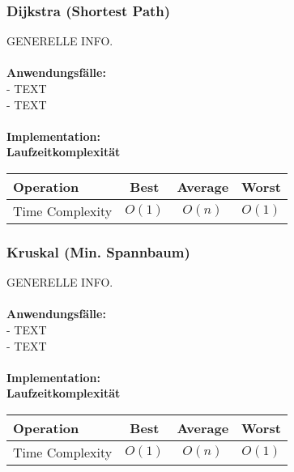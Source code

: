 \documentclass[../main.tex]{subfiles}
\begin{document}
	\subsubsection{Dijkstra (Shortest Path)}
	GENERELLE INFO. \\\\
	\textbf{Anwendungsfälle:}\\
	- TEXT\\
	- TEXT\\\\
	\textbf{Implementation:}\\
	 
	\textbf{Laufzeitkomplexität}\\
	\begin{table}[ht]
		\centering
		\begin{tabular}{l *{3}{c}}
			\toprule
			Operation & Best & Average & Worst\\
			\midrule
			Time Complexity & $O(1)$ & $O(n)$ & $O(1)$\\
			\bottomrule
		\end{tabular}
	\end{table}
	\clearpage
	
	\subsubsection{Kruskal (Min. Spannbaum)}
	GENERELLE INFO. \\\\
	\textbf{Anwendungsfälle:}\\
	- TEXT\\
	- TEXT\\\\
	\textbf{Implementation:}\\
	 
	\textbf{Laufzeitkomplexität}\\
	\begin{table}[ht]
		\centering
		\begin{tabular}{l *{3}{c}}
			\toprule
			Operation & Best & Average & Worst\\
			\midrule
			Time Complexity & $O(1)$ & $O(n)$ & $O(1)$\\
			\bottomrule
		\end{tabular}
	\end{table}
	\clearpage
\end{document}

